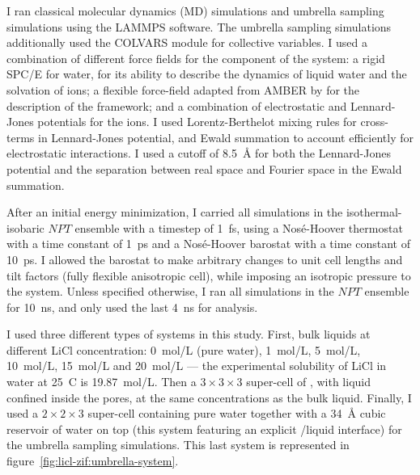 \documentclass[thesis]{subfiles}
\begin{document}
I ran classical molecular dynamics (MD) simulations and umbrella sampling
simulations using the LAMMPS\cite{Plimpton1993} software. The umbrella sampling
simulations additionally used the COLVARS\cite{Fiorin2013} module for collective
variables. I used a combination of different force fields for the component of
the system: a rigid SPC/E\cite{Berendsen1987} for water, for its ability to
describe the dynamics of liquid water and the solvation of ions; a flexible
force-field adapted from AMBER by \citeauthor{Zheng2012}\cite{Zheng2012} for the
description of the  framework; and a combination of electrostatic and
Lennard-Jones potentials for the ions\cite{Chowdhuri2003}. I used
Lorentz-Berthelot mixing rules for cross-terms in Lennard-Jones potential, and
Ewald summation to account efficiently for electrostatic interactions. I used a
cutoff of \SI{8.5}{\AA} for both the Lennard-Jones potential and the
separation between real space and Fourier space in the Ewald summation.

After an initial energy minimization, I carried all simulations in the
isothermal-isobaric $NPT$ ensemble with a timestep of \SI{1}{fs}, using a
Nosé-Hoover thermostat with a time constant of \SI{1}{ps} and a Nosé-Hoover
barostat with a time constant of \SI{10}{ps}. I allowed the barostat to make
arbitrary changes to unit cell lengths and tilt factors (fully flexible
anisotropic cell), while imposing an isotropic pressure to the system. Unless
specified otherwise, I ran all simulations in the $NPT$ ensemble for
\SI{10}{ns}, and only used the last \SI{4}{ns} for analysis.

I used three different types of systems in this study. First, bulk liquids at
different LiCl concentration: \SI{0}{mol/L} (pure water), \SI{1}{mol/L},
\SI{5}{mol/L}, \SI{10}{mol/L}, \SI{15}{mol/L} and \SI{20}{mol/L} --- the
experimental solubility of LiCl in water at 25~{\textdegree C} is
\SI{19.87}{mol/L}. Then a $3\times3\times3$ super-cell of , with liquid
confined inside the pores, at the same concentrations as the bulk liquid.
Finally, I used a $2\times2\times3$  super-cell containing pure water
together with a \SI{34}{\AA} cubic reservoir of water on top (this system
featuring an explicit /liquid interface) for the umbrella sampling
simulations. This last system is represented in
figure~\ref{fig:licl-zif:umbrella-system}.
\end{document}

